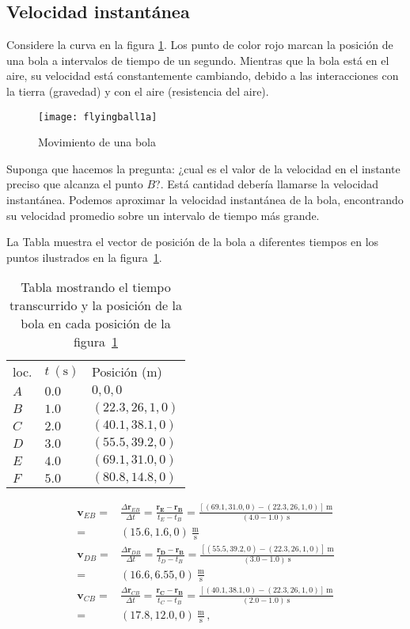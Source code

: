 \subsection{Velocidad instantánea}

Considere la curva en la figura \ref{fig:flyingball1a}. Los punto de color rojo marcan la posición de una bola a intervalos de tiempo de un segundo. Mientras que la bola está en el aire, su velocidad está constantemente cambiando, debido a las interacciones con la tierra (gravedad) y con el aire (resistencia del aire). 
\begin{figure}
  \centering
  \texttt{[image: flyingball1a]}
  \caption{Movimiento de una bola}
  \label{fig:flyingball1a}
\end{figure}

Suponga que hacemos la pregunta: ¿cual es el valor de la velocidad en el instante preciso que alcanza el punto $B$?. Está cantidad debería llamarse la velocidad instantánea. Podemos aproximar la velocidad instantánea de la bola, encontrando su velocidad promedio sobre un intervalo de tiempo más grande. 

La Tabla muestra el vector de posición de la bola a diferentes tiempos en los puntos ilustrados en la figura~\ref{fig:flyingball1a}.

\begin{table}
  \centering
  \begin{tabular}{|l|l|l|}
    loc. & $t\ (\text{s})$ & Posición (m)\\
    $A$ & $0.0$ &$0,0,0$ \\
    $B$ & $1.0$ &$(22.3,26,1,0)$ \\
    $C$ & $2.0$ &$(40.1,38.1,0)$ \\
    $D$ & $3.0$ &$(55.5,39.2,0)$ \\
    $E$ & $4.0$ &$(69.1,31.0,0)$ \\
    $F$ & $5.0$ &$(80.8,14.8,0)$ \\
  \end{tabular}
  \caption{Tabla mostrando el tiempo transcurrido y la posición de la bola en cada posición de la figura~\ref{fig:flyingball1a}}
  \label{tab:flyingball1a}
\end{table}

\begin{align}
  \mathbf{v}_{EB}=&\frac{\Delta \mathbf{r}_{EB}}{\Delta t}
=\frac{\mathbf{\mathbf{r}_E-\mathbf{r}_B}}{t_E-t_B}=
\frac{[(69.1,31.0,0)-(22.3,26,1,0)]\ \text{m}}{(4.0-1.0)\ \text{s}}\nonumber\\
=&(15.6,1.6,0)\ \frac{\text{m}}{\text{s}}\nonumber\\
  \mathbf{v}_{DB}=&\frac{\Delta \mathbf{r}_{DB}}{\Delta t}
=\frac{\mathbf{\mathbf{r}_D-\mathbf{r}_B}}{t_D-t_B}=
\frac{[(55.5,39.2,0)-(22.3,26,1,0)]\ \text{m}}{(3.0-1.0)\ \text{s}}\nonumber\\
=&(16.6,6.55,0)\ \frac{\text{m}}{\text{s}}\nonumber\\
  \mathbf{v}_{CB}=&\frac{\Delta \mathbf{r}_{CB}}{\Delta t}
=\frac{\mathbf{\mathbf{r}_C-\mathbf{r}_B}}{t_C-t_B}=
\frac{[(40.1,38.1,0)-(22.3,26,1,0)]\ \text{m}}{(2.0-1.0)\ \text{s}}\nonumber\\
=&(17.8,12.0,0)\ \frac{\text{m}}{\text{s}}\,,
\end{align}

